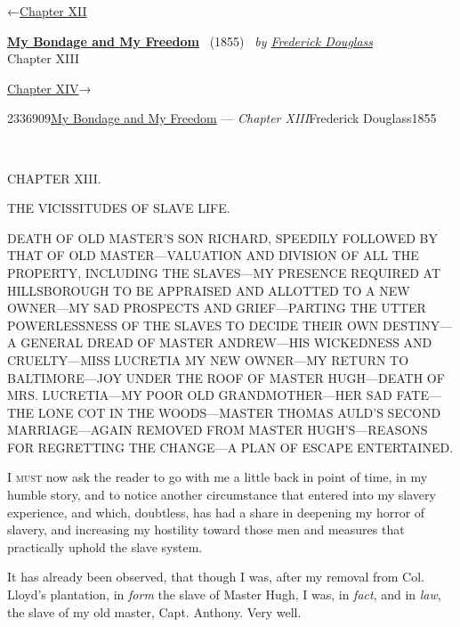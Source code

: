 \hypertarget{headerContainer}{}
\hypertarget{navigationHeader}{}
\protect\hypertarget{headerprevious}{}{←\href{/wiki/My_Bondage_and_My_Freedom_(1855)/Chapter_XII}{Chapter
XII}}

\textbf{\protect\hypertarget{header_title_text}{}{\href{/wiki/My_Bondage_and_My_Freedom_(1855)}{My
Bondage and My Freedom}}} ~(1855)~ \emph{by
\href{/wiki/Author:Frederick_Douglass}{\protect\hypertarget{header_author_text}{}{{Frederick
Douglass}}}}\\
\protect\hypertarget{header_section_text}{}{Chapter XIII}

\protect\hypertarget{headernext}{}{\href{/wiki/My_Bondage_and_My_Freedom_(1855)/Chapter_XIV}{Chapter
XIV}→}

\hypertarget{navigationNotes}{}

\hypertarget{ws-data}{}
\protect\hypertarget{ws-article-id}{}{2336909}\protect\hypertarget{ws-title}{}{\href{/wiki/My_Bondage_and_My_Freedom_(1855)}{My
Bondage and My Freedom} --- \emph{Chapter
XIII}}\protect\hypertarget{ws-author}{}{Frederick
Douglass}\protect\hypertarget{ws-year}{}{1855}

{\protect\hypertarget{173}{}{}}

~

{CHAPTER XIII.}

THE VICISSITUDES OF SLAVE LIFE.

{DEATH OF OLD MASTER'S SON RICHARD, SPEEDILY FOLLOWED BY THAT OF OLD
MASTER---VALUATION AND DIVISION OF ALL THE PROPERTY, INCLUDING THE
SLAVES---MY PRESENCE REQUIRED AT HILLSBOROUGH TO BE APPRAISED AND
ALLOTTED TO A NEW OWNER---MY SAD PROSPECTS AND GRIEF---PARTING THE UTTER
POWERLESSNESS OF THE SLAVES TO DECIDE THEIR OWN DESTINY---A GENERAL
DREAD OF MASTER ANDREW---HIS WICKEDNESS AND CRUELTY---MISS LUCRETIA MY
NEW OWNER---MY RETURN TO BALTIMORE---JOY UNDER THE ROOF OF MASTER
HUGH---DEATH OF MRS. LUCRETIA---MY POOR OLD GRANDMOTHER---HER SAD
FATE---THE LONE COT IN THE WOODS---MASTER THOMAS AULD'S SECOND
MARRIAGE---AGAIN REMOVED FROM MASTER HUGH'S---REASONS FOR REGRETTING THE
CHANGE---A PLAN OF ESCAPE ENTERTAINED.}

\textsc{I must} now ask the reader to go with me a little back in point
of time, in my humble story, and to notice another circumstance that
entered into my slavery experience, and which, doubtless, has had a
share in deepening my horror of slavery, and increasing my hostility
toward those men and measures that practically uphold the slave system.

It has already been observed, that though I was, after my removal from
Col. Lloyd's plantation, in \emph{form} the slave of Master Hugh, I was,
in \emph{fact}, and in \emph{law}, the slave of my old master, Capt.
Anthony. Very well.

